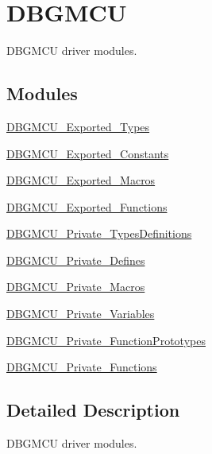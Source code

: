 \hypertarget{group___d_b_g_m_c_u}{}\section{D\+B\+G\+M\+CU}
\label{group___d_b_g_m_c_u}


D\+B\+G\+M\+CU driver modules.  


\subsection*{Modules}
\begin{DoxyCompactItemize}
\item 
\mbox{\hyperlink{group___d_b_g_m_c_u___exported___types}{D\+B\+G\+M\+C\+U\+\_\+\+Exported\+\_\+\+Types}}
\item 
\mbox{\hyperlink{group___d_b_g_m_c_u___exported___constants}{D\+B\+G\+M\+C\+U\+\_\+\+Exported\+\_\+\+Constants}}
\item 
\mbox{\hyperlink{group___d_b_g_m_c_u___exported___macros}{D\+B\+G\+M\+C\+U\+\_\+\+Exported\+\_\+\+Macros}}
\item 
\mbox{\hyperlink{group___d_b_g_m_c_u___exported___functions}{D\+B\+G\+M\+C\+U\+\_\+\+Exported\+\_\+\+Functions}}
\item 
\mbox{\hyperlink{group___d_b_g_m_c_u___private___types_definitions}{D\+B\+G\+M\+C\+U\+\_\+\+Private\+\_\+\+Types\+Definitions}}
\item 
\mbox{\hyperlink{group___d_b_g_m_c_u___private___defines}{D\+B\+G\+M\+C\+U\+\_\+\+Private\+\_\+\+Defines}}
\item 
\mbox{\hyperlink{group___d_b_g_m_c_u___private___macros}{D\+B\+G\+M\+C\+U\+\_\+\+Private\+\_\+\+Macros}}
\item 
\mbox{\hyperlink{group___d_b_g_m_c_u___private___variables}{D\+B\+G\+M\+C\+U\+\_\+\+Private\+\_\+\+Variables}}
\item 
\mbox{\hyperlink{group___d_b_g_m_c_u___private___function_prototypes}{D\+B\+G\+M\+C\+U\+\_\+\+Private\+\_\+\+Function\+Prototypes}}
\item 
\mbox{\hyperlink{group___d_b_g_m_c_u___private___functions}{D\+B\+G\+M\+C\+U\+\_\+\+Private\+\_\+\+Functions}}
\end{DoxyCompactItemize}


\subsection{Detailed Description}
D\+B\+G\+M\+CU driver modules. 

